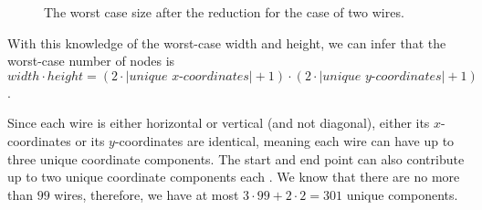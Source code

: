 \documentclass[sigconf,nonacm,screen]{acmart}
\begin{document}
\begin{figure}[h]
    \centering
    \caption{The worst case size after the reduction for the case of two wires.}
    \label{fig:worst_case_two_wires}
\end{figure}

With this knowledge of the worst-case width and height, we can infer that the worst-case number of nodes is $width \cdot height = (2\cdot |\textit{unique x-coordinates}|+1) \cdot (2\cdot|\textit{unique y-coordinates}|+1)$.

Since each wire is either horizontal or vertical (and not diagonal), either its $x$-coordinates or its $y$-coordinates are identical, meaning each wire can have up to three unique coordinate components. The start and end point can also contribute up to two unique coordinate components each%
.
We know that there are no more than $99$ wires, therefore, we have at most $3 \cdot 99 + 2 \cdot 2 = 301$ unique components.
\end{document}
